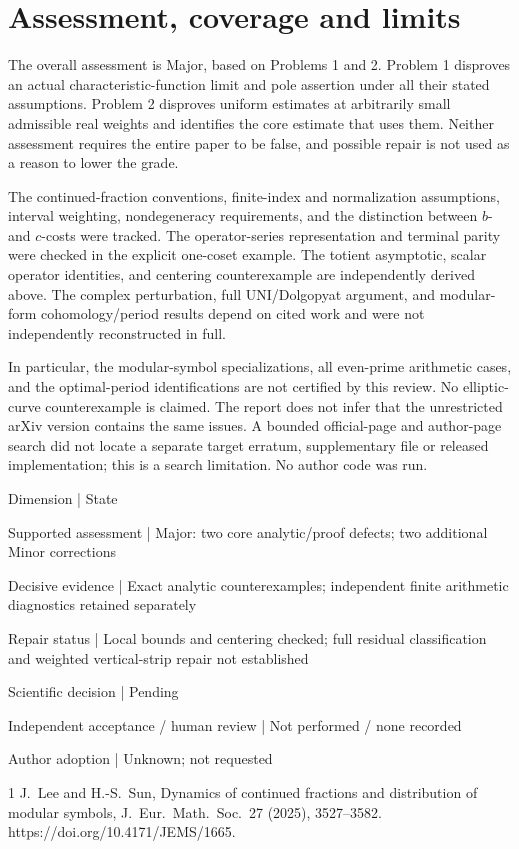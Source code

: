 \documentclass[10pt]{article}
\begin{document}
\section*{Assessment, coverage and limits}
The overall assessment is Major, based on Problems 1 and 2. Problem 1 disproves an actual characteristic-function limit and pole assertion under all their stated assumptions. Problem 2 disproves uniform estimates at arbitrarily small admissible real weights and identifies the core estimate that uses them. Neither assessment requires the entire paper to be false, and possible repair is not used as a reason to lower the grade.\par
The continued-fraction conventions, finite-index and normalization assumptions, interval weighting, nondegeneracy requirements, and the distinction between \(b\)- and \(c\)-costs were tracked. The operator-series representation and terminal parity were checked in the explicit one-coset example. The totient asymptotic, scalar operator identities, and centering counterexample are independently derived above. The complex perturbation, full UNI/Dolgopyat argument, and modular-form cohomology/period results depend on cited work and were not independently reconstructed in full.\par
In particular, the modular-symbol specializations, all even-prime arithmetic cases, and the optimal-period identifications are not certified by this review. No elliptic-curve counterexample is claimed. The report does not infer that the unrestricted arXiv version contains the same issues. A bounded official-page and author-page search did not locate a separate target erratum, supplementary file or released implementation; this is a search limitation. No author code was run.\par
Dimension | State\par
Supported assessment | Major: two core analytic/proof defects; two additional Minor corrections\par
Decisive evidence | Exact analytic counterexamples; independent finite arithmetic diagnostics retained separately\par
Repair status | Local bounds and centering checked; full residual classification and weighted vertical-strip repair not established\par
Scientific decision | Pending\par
Independent acceptance / human review | Not performed / none recorded\par
Author adoption | Unknown; not requested\par
1 J. Lee and H.-S. Sun, Dynamics of continued fractions and distribution of modular symbols, J. Eur. Math. Soc. 27 (2025), 3527–3582. https://doi.org/10.4171/JEMS/1665.\par
\end{document}
